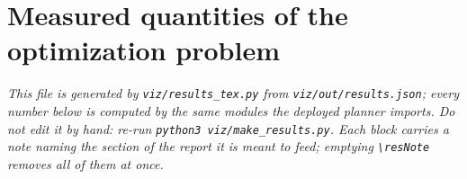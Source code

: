 %
%
%

\providecommand{\resSec}[1]{\section{#1}}
\providecommand{\resSubsec}[1]{\subsection{#1}}
\providecommand{\resNote}[1]{{\small\itshape #1\par\medskip}}

\providecommand{\R}{\mathbb{R}}
\providecommand{\Wobs}{W_{\mathrm{obs}}}
\providecommand{\robs}{r_{\mathrm{obs}}}
\providecommand{\aobs}{\alpha_{\mathrm{obs}}}
\providecommand{\Jobs}{J_{\mathrm{obs}}}
\providecommand{\astar}{$A^\star$}

\resSec{Measured quantities of the optimization problem}
\label{res:top}

\resNote{This file is generated by \texttt{viz/results\_tex.py} from \texttt{viz/out/results.json}; every number below is computed by the same modules the deployed planner imports. Do not edit it by hand: re-run \texttt{python3 viz/make\_results.py}. Each block carries a note naming the section of the report it is meant to feed; emptying \texttt{\textbackslash resNote} removes all of them at once.}

